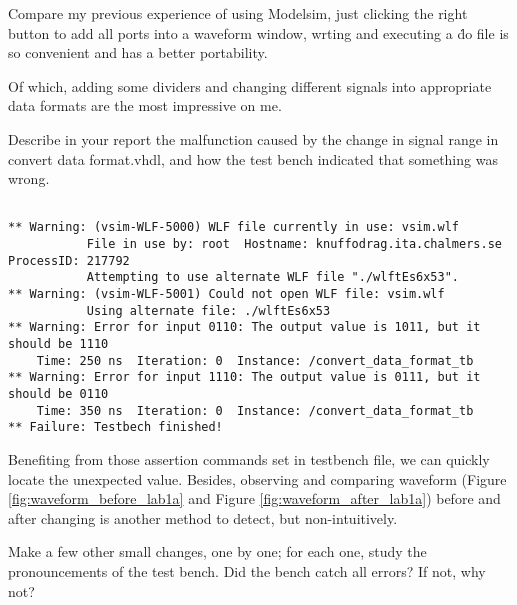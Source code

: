 \documentclass[12pt]{article}
\begin{document}
\begin{notebox}
    Compare my previous experience of using Modelsim, just clicking the right button to add all ports into a waveform window, wrting and executing a \.do file is so convenient and has a better portability.

    Of which, adding some dividers and changing different signals into appropriate data formats are the most impressive on me.
\end{notebox}

\begin{questionbox}
Describe in your report the malfunction caused by the change in signal range in convert data format.vhdl, and how the test bench indicated that something was wrong.
\end{questionbox}


\begin{lstlisting}[caption={Errors and warnings show in terminal}, label={lst:info-error-lab1a}, language=info_terminal]

** Warning: (vsim-WLF-5000) WLF file currently in use: vsim.wlf
           File in use by: root  Hostname: knuffodrag.ita.chalmers.se  ProcessID: 217792
           Attempting to use alternate WLF file "./wlftEs6x53".
** Warning: (vsim-WLF-5001) Could not open WLF file: vsim.wlf
           Using alternate file: ./wlftEs6x53
** Warning: Error for input 0110: The output value is 1011, but it should be 1110
    Time: 250 ns  Iteration: 0  Instance: /convert_data_format_tb
** Warning: Error for input 1110: The output value is 0111, but it should be 0110
    Time: 350 ns  Iteration: 0  Instance: /convert_data_format_tb
** Failure: Testbech finished!

\end{lstlisting}

Benefiting from those assertion commands set in testbench file, we can quickly locate the unexpected value.
Besides, observing and comparing waveform (Figure \ref{fig:waveform_before_lab1a} and Figure \ref{fig:waveform_after_lab1a}) before and after changing is another method to detect, but non-intuitively.



\begin{questionbox}
Make a few other small changes, one by one; for each one, study the pronouncements of the test bench.
Did the bench catch all errors?
If not, why not?
\end{questionbox}
\end{document}
